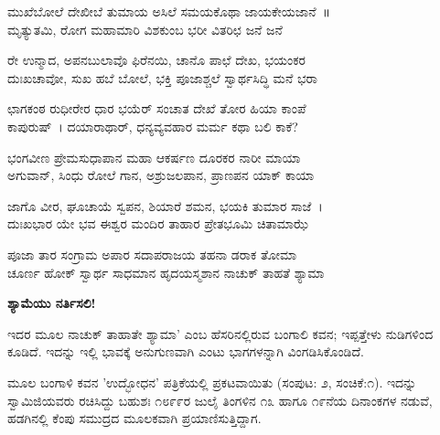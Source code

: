 
\begin{myquote}
ಮುಖೆಬೋಲೆ ದೇಖೀಬೆ ತುಮಾಯ ಅಸಿಲೆ ಸಮಯಕೊಥಾ ಜಾಯಕೇಯಜಾನೆ~॥\\ಮೃತ್ಯುತಮಿ, ರೋಗ ಮಹಾಮಾರಿ ವಿಶಕುಂಬ ಭರೀ ವಿತರಿಛ ಜನೆ ಜನೆ
\end{myquote}


\begin{myquote}
ರೇ ಉನ್ಮಾದ, ಅಪನಬುಲಾವೊ ಫಿರೆನಯಿ, ಚಾನೊ ಪಾಛೆ ದೇಖ, ಭಯಂಕರ\\ದುಃಖಚಾವೋ, ಸುಖ ಹಬೆ ಬೋಲೆ, ಭಕ್ತಿ ಪೂಜಾಶ್ಚಲೆ ಸ್ವಾರ್ಥಸಿದ್ಧಿ ಮನೆ ಭರಾ
\end{myquote}


\begin{myquote}
ಛಾಗಕಂಠ ರುಧೀರೇರ ಧಾರ ಭಯೆರ್ ಸಂಚಾತ ದೇಖೆ ತೋರ ಹಿಯಾ ಕಾಂಪೆ\\ಕಾಪುರುಷ್~। ದಯಾರಾಥಾರ್, ಧನ್ಯವ್ಯವಹಾರ ಮರ್ಮ ಕಥಾ ಬಲಿ ಕಾಕೆ?
\end{myquote}


\begin{myquote}
ಭಂಗವೀಣ ಪ್ರೇಮಸುಧಾಪಾನ ಮಹಾ ಆಕರ್ಷಣ ದೂರಕರ ನಾರೀ ಮಾಯಾ\\ಅಗುವಾನ್, ಸಿಂಧು ರೋಲೆ ಗಾನ, ಅಶ್ರುಜಲಪಾನ, ಪ್ರಾಣಪನ ಯಾಕ್ ಕಾಯಾ
\end{myquote}


\begin{myquote}
ಜಾಗೊ ವೀರ, ಘೂಚಾಯೆ ಸ್ವಪನ, ಶಿಯಾರೆ ಶಮನ, ಭಯಕಿ ತುಮಾರ ಸಾಜೆ~।\\ದುಃಖಭಾರ ಯೇ ಭವ ಈಶ್ವರ ಮಂದಿರ ತಾಹಾರ ಪ್ರೇತಭೂಮಿ ಚಿತಾಮಾಝೆ
\end{myquote}


\begin{myquote}
ಪೂಜಾ ತಾರ ಸಂಗ್ರಾಮ ಅಪಾರ ಸದಾಪರಾಜಯ ತಹನಾ ಡರಾಕ ತೋಮಾ\\ಚೂರ್ಣ ಹೋಕ್ ಸ್ವಾರ್ಥ ಸಾಧಮಾನ ಹೃದಯಸ್ಮಶಾನ ನಾಚುಕ್ ತಾಹತೆ ಶ್ಯಾಮಾ
\end{myquote}


\begin{center}
\textbf{ಶ್ಯಾಮೆಯು ನರ್ತಿಸಲಿ!}
\end{center}

ಇದರ ಮೂಲ ನಾಚುಕ್ ತಾಹಾತೇ ಶ್ಯಾಮಾ' ಎಂಬ ಹೆಸರಿನಲ್ಲಿರುವ ಬಂಗಾಲಿ ಕವನ; ಇಪ್ಪತ್ತೇಳು ನುಡಿಗಳಿಂದ ಕೂಡಿದೆ. ಇದನ್ನು ಇಲ್ಲಿ ಭಾವಕ್ಕೆ ಅನುಗುಣವಾಗಿ ಎಂಟು ಭಾಗಗಳನ್ನಾಗಿ ವಿಂಗಡಿಸಿಕೊಂಡಿದೆ.

ಮೂಲ ಬಂಗಾಳಿ ಕವನ 'ಉದ್ಭೋಧನ' ಪತ್ರಿಕೆಯಲ್ಲಿ ಪ್ರಕಟವಾಯಿತು (ಸಂಪುಟ: ೨, ಸಂಚಿಕೆ:೧). ಇದನ್ನು ಸ್ವಾಮಿಜಿಯವರು ರಚಿಸಿದ್ದು ಬಹುಶಃ ೧೮೯೯ರ ಜುಲೈ ತಿಂಗಳಿನ ೧೩ ಹಾಗೂ ೧೯ನೆಯ ದಿನಾಂಕಗಳ ನಡುವೆ, ಹಡಗಿನಲ್ಲಿ ಕೆಂಪು ಸಮುದ್ರದ ಮೂಲಕವಾಗಿ ಪ್ರಯಾಣಿಸುತ್ತಿದ್ದಾಗ.

